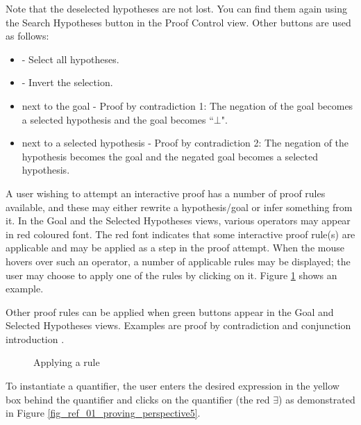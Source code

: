 Note that the deselected hypotheses are not lost. You can find them again using the \textsf{Search Hypotheses}  button in the Proof Control view. Other buttons are used as follows:

\begin{itemize}
	\item {} - Select all hypotheses. 
	\item {} - Invert the selection. 
	\item {} next to the goal - Proof by contradiction 1: The negation of the goal becomes a selected hypothesis and the goal becomes ``$\bot$". 
	\item {} next to a selected hypothesis - Proof by contradiction 2: The negation of the hypothesis becomes the goal and the negated goal becomes a selected hypothesis. 
\end{itemize}

A user wishing to attempt an interactive proof has a number of proof rules available, and these may either rewrite a hypothesis/goal or infer something from it. In the \textsf{Goal} and the \textsf{Selected Hypotheses} views, various operators may appear in red coloured font. The red font indicates that some interactive proof rule(s) are applicable and may be applied as a step in the proof attempt. When the mouse hovers over such an operator, a number of applicable rules may be displayed; the user may choose to apply one of the rules by clicking on it. Figure \ref{fig_ref_01_proving_perspective4} shows an example.

Other proof rules can be applied when green buttons appear in the \textsf{Goal} and \textsf{Selected Hypotheses} views. Examples are proof by contradiction  and conjunction introduction . 

\begin{figure}[!ht]
\begin{center}
	\caption{Applying a rule}
	\label{fig_ref_01_proving_perspective4}
\end{center}
\end{figure}

To instantiate a quantifier, the user enters the desired expression in the yellow box behind the quantifier and clicks on the quantifier (the red $\exists$) as demonstrated in Figure \ref{fig_ref_01_proving_perspective5}.

